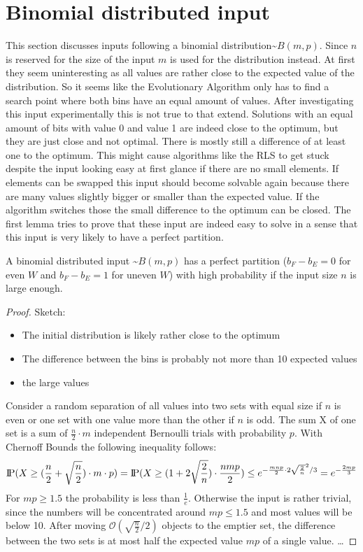 \section{Binomial distributed input}
This section discusses inputs following a binomial distribution\textasciitilde$B(m,p)$.
Since $n$ is reserved for the size of the input $m$ is used for the distribution instead.
At first they seem uninteresting as all values are rather close to the expected value of the distribution.
So it seems like the Evolutionary Algorithm only has to find a search point where both bins have an equal amount of values.
After investigating this input experimentally this is not true to that extend.
Solutions with an equal amount of bits with value 0 and value 1 are indeed close to the optimum, but they are just close and not optimal.
There is mostly still a difference of at least one to the optimum.
This might cause algorithms like the RLS to get stuck despite the input looking easy at first glance if there are no small elements.
If elements can be swapped this input should become solvable again because there are many values slightly bigger or smaller than the expected value.
If the algorithm switches those the small difference to the optimum can be closed.
The first lemma tries to prove that these input are indeed easy to solve in a sense that this input is very likely to have a perfect partition.

\begin{lemma}\label{lemma:BinomialSolvable}
    A binomial distributed input \textasciitilde$B(m,p)$ has a perfect partition ($b_F - b_E = 0$ for even $W$ and $b_F - b_E = 1$ for uneven $W$) with high probability if the input size $n$ is large enough.
\end{lemma}
\begin{proof}
    Sketch:
    \begin{itemize}
        \item The initial distribution is likely rather close to the optimum
        \item The difference between the bins is probably not more than 10 expected values
        \item the large values
    \end{itemize}
    Consider a random separation of all values into two sets with equal size if $n$ is even or one set with one value more than the other if $n$ is odd. The sum X of one set is a sum of $\frac{n}{2}\cdot m$ independent Bernoulli trials with probability $p$. With Chernoff Bounds the following inequality follows:
    \[\text{I\kern-0.15em P}(X\ge(\frac{n}{2}+\sqrt{\frac{n}{2}})\cdot m \cdot p) = \text{I\kern-0.15em P}(X\ge(1+2\sqrt{\frac{2}{n}})\cdot \frac{nmp}{2}) \le e^{-\frac{mnp}{2}\cdot2\sqrt{\frac{2}{n}}^2 /3} = e^{-\frac{2mp}{3}}\]
    For $mp\ge1.5$ the probability is less than $\frac{1}{e}$. Otherwise the input is rather trivial, since the numbers will be concentrated around $mp\le1.5$ and most values will be below 10.\newline
    After moving $\mathcal{O}(\sqrt{\frac{n}{2}}/2)$ objects to the emptier set, the difference between the two sets is at most half the expected value $mp$ of a single value.
    \dots
\end{proof}


